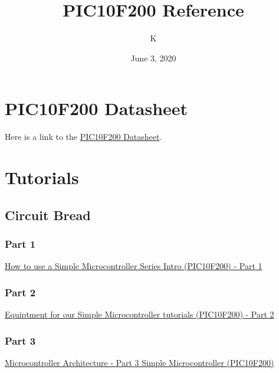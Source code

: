 \documentclass[12pt, letterpaper]{article}
\title{PIC10F200 Reference}
\author{K}
\date{June 3, 2020}
\begin{document}
\begin{comment}
\begin{titlepage}
    \maketitle
\end{titlepage}
\end{comment}

\maketitle

\tableofcontents{}
\pagebreak

\section{PIC10F200 Datasheet}
Here is a link to the \href{https://ww1.microchip.com/downloads/en/DeviceDoc/40001239F.pdf}{PIC10F200 Datasheet}.

\section{Tutorials}
\subsection{Circuit Bread}
\subsubsection{Part 1}
\href{https://www.circuitbread.com/tutorials/how-to-use-a-simple-microcontroller-series-intro-pic10f200-part-1}{How to use a Simple Microcontroller Series Intro (PIC10F200) - Part 1}\\
\subsubsection{Part 2}
\href{https://www.circuitbread.com/tutorials/equipment-for-our-simple-microcontroller-tutorials-pic10f200-part-2}{Equiptment for our Simple Microcontroller tutorials (PIC10F200) - Part 2}\\
\subsubsection{Part 3}
\href{https://www.circuitbread.com/tutorials/microcontroller-architecture-part-3-simple-microcontroller-pic10f200}{Microcontroller Architecture - Part 3 Simple Microcontroller (PIC10F200)}\\
\end{document}
